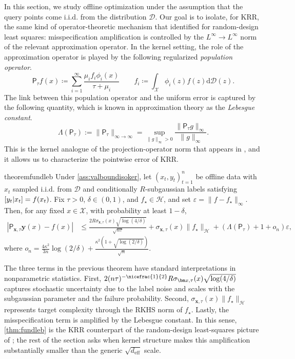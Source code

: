 \documentclass{article}
\let\E\relax
\DeclareMathOperator*{\E}{\mathbb E}
\let\cite\citep
\numberwithin{theorem}{section}
\theoremstyle{definition}
\newcommand{\diff}{\text{d}}
\newcommand{\fwithin}{f_\star}
\newcommand{\inpdist}{\Ds}
\newcommand{\Ds}{\mathcal D}
\newcommand{\Hs}{\mathcal H}
\newcommand{\Xs}{\mathcal X}
\begin{document}
In this section, we study offline optimization under the assumption that the query points come i.i.d. from the distribution $\inpdist$. Our goal is to isolate, for KRR, the same kind of operator-theoretic mechanism that \cite{maran2025beyond} identified for random-design least squares: misspecification amplification is controlled by the $L^\infty\to L^\infty$ norm of the relevant approximation operator. In the kernel setting, the role of the approximation operator is played by the following regularized \textit{population operator}.
\begin{equation}                
    \mathsf{P}_{\tau}f(x)\coloneqq \sum_{i=1}^\infty \frac{\mu_i f_i\phi_i(x)}{\tau+\mu_i}\qquad f_i\coloneqq \int_\Xs \phi_i(z)f(z)\diff \inpdist(z).\label{eq:popul}
\end{equation}
The link between this population operator and the uniform error is captured by the following quantity, which is known in approximation theory as the \textit{Lebesgue constant}.
\begin{equation}
\Lambda(\mathsf{P}_{\tau}):=\|\mathsf{P}_{\tau}\|_{\infty\to \infty}=\sup_{\|g\|_\infty>0}\frac{\|\mathsf{P}_{\tau} g\|_\infty}{\|g\|_\infty}.\label{eq:leb}\end{equation}
This is the kernel analogue of the projection-operator norm that appears in \cite{maran2025beyond}, and it allows us to characterize the pointwise error of KRR.
\begin{restatable}{theorem}{fundleb}\label{thm:fundleb} 
    Under \cref{ass:valboundisoker}, let $(x_t,y_t)_{t=1}^n$ be offline data with $x_t$ sampled i.i.d. from $\inpdist$ and conditionally $R$-subgaussian labels satisfying $\E[y_t|x_t]=f(x_t)$. Fix $\tau>0$, $\delta\in(0,1)$, and $\fwithin\in\Hs$, and set $\varepsilon=\|f-\fwithin\|_\infty$. Then, for any fixed $x\in \Xs$, with probability at least $1-\delta$,
    \begin{align*}
        |\mathsf{P}_{\bm x,\tau}\bm y(x)-f(x)|&\le \frac{2R\sigma_{\bm x,\tau}(x)\sqrt{\log(4/\delta)}}{\sqrt {n\tau}}+ \sigma_{\bm x,\tau}(x)\|\fwithin\|_{\Hs}+\left(\Lambda(\mathsf{P}_{\tau})+1+o_n\right)\varepsilon,
    \end{align*}
    where $o_n=\frac{4\kappa^2}{3n}\log(2/\delta)+\frac{\kappa^2 (1+\sqrt{\log(2/\delta)})}{\sqrt n}$.
\end{restatable}
The three terms in the previous theorem have standard interpretations in nonparametric statistics. First, $2(n\tau)^{-\nicefrac{1}{2}}R\sigma_{\bm x,\tau}(x)\sqrt{\log(4/\delta)}$ captures stochastic uncertainty due to the label noise and scales with the subgaussian parameter and the failure probability. Second, $\sigma_{\bm x,\tau}(x)\|\fwithin\|_{\Hs}$ represents target complexity through the RKHS norm of $\fwithin$. Lastly, the misspecification term is amplified by the Lebesgue constant. In this sense, \cref{thm:fundleb} is the KRR counterpart of the random-design least-squares picture of \cite{maran2025beyond}; the rest of the section asks when kernel structure makes this amplification substantially smaller than the generic $\sqrt{d_\text{eff}}$ scale.
\end{document}
